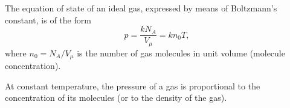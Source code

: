 The equation of state of an ideal gas, expressed by means of Boltzmann's constant, is of the form
\begin{equation*}%
p = \frac{kN_{A}}{V_{\mu}} = kn_{0}T,
\end{equation*}
where $n_{0}= N_{A}/V_{\mu}$ is the number of gas molecules in unit volume (molecule concentration).

At constant temperature, the pressure of a gas is proportional to the concentration of its molecules (or to the density of the gas).

